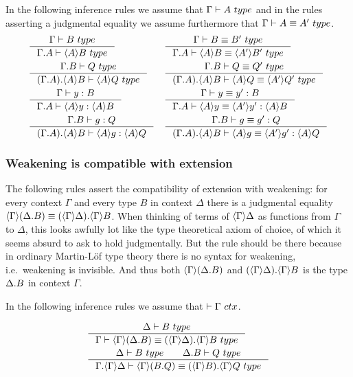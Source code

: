  In the following inference rules we assume that $\jtype{\Gamma}{A}$ and in the
 rules asserting a judgmental equality we assume furthermore that 
 $\jtypeeq{\Gamma}{A}{A'}$.
\begin{align}
& \inference{\jtype{\Gamma}{B}}{\jtype{\ctxext{\Gamma}{A}}{\ctxwk{A}{B}}}
& & \inference{\jtypeeq{\Gamma}{B}{B'}}{\jtypeeq{\ctxext{\Gamma}{A}}{\ctxwk{A}{B}}{\ctxwk{A'}{B'}}}\\
& \inference{\jtype{\ctxext{\Gamma}{B}}{Q}}
{\jtype{\ctxext{{\Gamma}{A}}{\ctxwk{A}{B}}}{\ctxwk{A}{Q}}}
& & \inference{\jtypeeq{\ctxext{\Gamma}{B}}{Q}{Q'}}
{\jtypeeq{\ctxext{{\Gamma}{A}}{\ctxwk{A}{B}}}{\ctxwk{A}{Q}}{\ctxwk{A'}{Q'}}}\\
& \inference{\jterm{\Gamma}{B}{y}}{\jterm{\ctxext{\Gamma}{A}}{\ctxwk{A}{B}}{\ctxwk{A}{y}}}
& & \inference{\jtermeq{\Gamma}{B}{y}{y'}}{\jtermeq{\ctxext{\Gamma}{A}}{\ctxwk{A}{B}}{\ctxwk{A}{y}}{\ctxwk{A'}{y'}}}\\
& \inference{\jterm{\ctxext{\Gamma}{B}}{Q}{g}}{\jterm{\ctxext{{\Gamma}{A}}{\ctxwk{A}{B}}}{\ctxwk{A}{Q}}{\ctxwk{A}{g}}}
& & \inference{\jtermeq{\ctxext{\Gamma}{B}}{Q}{g}{g'}}
{\jtermeq{\ctxext{{\Gamma}{A}}{\ctxwk{A}{B}}}{\ctxwk{A}{Q}}{\ctxwk{A}{g}}{\ctxwk{A'}{g'}}}
\end{align}

\subsubsection{Weakening is compatible with extension}

The following rules assert the compatibility of extension with weakening: for
every context $\Gamma$ and every type $B$ in context $\Delta$ there is a
judgmental equality $\ctxwk{\Gamma}{\ctxext{\Delta}{B}}\jdeq\ctxext{\ctxwk{\Gamma}{\Delta}}
{\ctxwk{\Gamma}{B}}$. When thinking of terms of $\ctxwk{\Gamma}{\Delta}$ as
functions from $\Gamma$ to $\Delta$, this looks awfully lot like the type
theoretical axiom of choice, of which it seems absurd to ask to hold judgmentally.
But the rule should be there because in ordinary Martin-L\"of type theory
there is no syntax for weakening, i.e.~weakening is invisible. 
And thus both $\ctxwk{\Gamma}{\ctxext{\Delta}{B}}$ 
and $\ctxext{\ctxwk{\Gamma}{\Delta}}{\ctxwk{\Gamma}{B}}$ is the type
$\ctxext{\Delta}{B}$ in context $\Gamma$.

In the following inference rules we assume that $\jctx{\Gamma}$. 

\begin{align}
& \inference
  {\jtype{\Delta}{B}}
  {\jtypeeq{\Gamma}{\ctxwk{\Gamma}{\ctxext{\Delta}{B}}}{\ctxext{\ctxwk{\Gamma}{\Delta}}{\ctxwk{\Gamma}{B}}}}\\
& \inference
  {\jtype{\Delta}{B}\qquad\jtype{\ctxext{\Delta}{B}}{Q}}
  {\jtypeeq
    {\ctxext{\Gamma}{\ctxwk{\Gamma}{\Delta}}}
    {\ctxwk{\Gamma}{\ctxext{B}{Q}}}
    {\ctxext{\ctxwk{\Gamma}{B}}{\ctxwk{\Gamma}{Q}}}}
\end{align}

